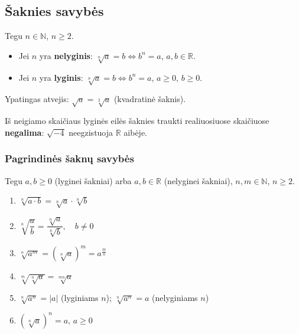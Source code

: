 \subsection{Šaknies savybės}

\begin{definition}
Tegu $n \in \mathbb{N}$, $n \geq 2$.
\begin{itemize}
    \item Jei $n$ yra \textbf{nelyginis}: $\sqrt[n]{a} = b \iff b^n = a$,
          $a, b \in \mathbb{R}$.
    \item Jei $n$ yra \textbf{lyginis}: $\sqrt[n]{a} = b \iff b^n = a$,
          $a \geq 0$, $b \geq 0$.
\end{itemize}
Ypatingas atvejis: $\sqrt{a} = \sqrt[2]{a}$ (kvadratinė šaknis).
\end{definition}

\begin{remark}
Iš neigiamo skaičiaus lyginės eilės šaknies traukti realiuosiuose skaičiuose
\textbf{negalima}: $\sqrt{-4}$ neegzistuoja $\mathbb{R}$ aibėje.
\end{remark}

\subsubsection*{Pagrindinės šaknų savybės}

\begin{tcolorbox}[title={Šaknų savybės (santrauka)}, colback=blue!5!white,
                  colframe=blue!60!black]
Tegu $a, b \geq 0$ (lyginei šakniai) arba $a, b \in \mathbb{R}$
(nelyginei šakniai), $n, m \in \mathbb{N}$, $n \geq 2$.
\begin{enumerate}[label=\textbf{Š\arabic*.}]
    \item $\sqrt[n]{a \cdot b} = \sqrt[n]{a} \cdot \sqrt[n]{b}$
    \item $\sqrt[n]{\dfrac{a}{b}} = \dfrac{\sqrt[n]{a}}{\sqrt[n]{b}},
          \quad b \neq 0$
    \item $\sqrt[n]{a^m} = \left(\sqrt[n]{a}\right)^m = a^{\frac{m}{n}}$
    \item $\sqrt[m]{\sqrt[n]{a}} = \sqrt[mn]{a}$
    \item $\sqrt[n]{a^n} = |a|$ (lyginiams $n$); \quad
          $\sqrt[n]{a^n} = a$ (nelyginiams $n$)
    \item $(\sqrt[n]{a})^n = a$, \quad $a \geq 0$
\end{enumerate}
\end{tcolorbox}

